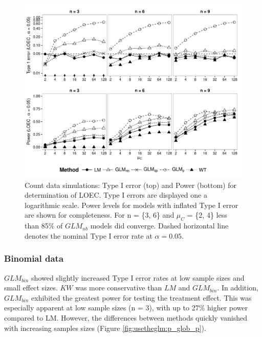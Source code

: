 \begin{figure}
  \centering
  \includegraphics[width = \textwidth]{chapters/usetheglm/p_loec_c.pdf}
  \caption[Count data simulations: Type I error and Power for determination of LOEC.]{Count data simulations: Type I error (top) and Power (bottom) for determination of LOEC.
  Type I errors are displayed one a logarithmic scale.
  Power levels for models with inflated Type I error are shown for completeness.
  For n = \{3, 6\} and $\mu_C$ = \{2, 4\} less than 85\% of $GLM_{nb}$ models did converge.
  Dashed horizontal line denotes the nominal Type I error rate at $\alpha = 0.05$.
  }
  \label{fig:usetheglm:p_loec_c}
\end{figure}


\subsubsection{Binomial data}
$GLM_{bin}$ showed slightly increased Type I error rates at low sample sizes and small effect sizes.
$KW$ was more conservative than $LM$ and $GLM_{bin}$.
In addition, $GLM_{bin}$ exhibited the greatest power for testing the treatment effect. 
This was especially apparent at low sample sizes (n = 3), with up to 27\% higher power compared to LM.
However, the differences between methods quickly vanished with increasing samples sizes (Figure \ref{fig:usetheglm:p_glob_p}).

